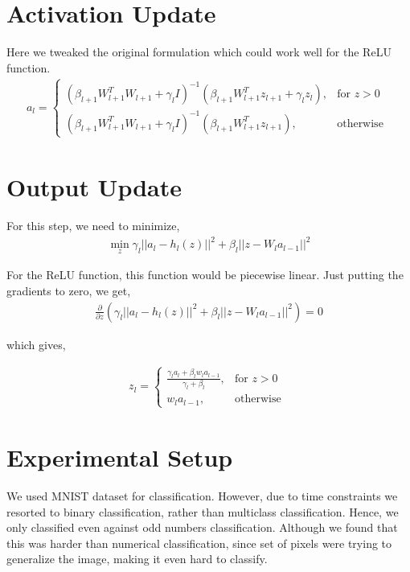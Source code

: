 \documentclass[12pt]{article}
\begin{document}
\section{Activation Update}

Here we tweaked the original formulation which could work well for the ReLU function.
\begin{align*}
	a_l = \begin{cases}
		(\beta_{l+1} W_{l+1}^TW_{l+1} + \gamma_l I)^{-1}(\beta_{l+1} W_{l+1}^Tz_{l+1} + \gamma_l z_l), & \text{for } z > 0 \\
		(\beta_{l+1} W_{l+1}^TW_{l+1} + \gamma_l I)^{-1}(\beta_{l+1} W_{l+1}^Tz_{l+1}), & \text{otherwise }
	\end{cases}
\end{align*}

\section{Output Update}

For this step, we need to minimize, 
\begin{align*}
\min_z \gamma_l || a_l - h_l(z) ||^2 + \beta_l || z - W_la_{l-1} ||^2
\end{align*}

For the ReLU function, this function would be piecewise linear. Just putting the gradients to zero, we get,
\begin{align*}
	\frac{\partial}{\partial z} \left(  \gamma_l || a_l - h_l(z) ||^2 + \beta_l || z - W_la_{l-1} ||^2 \right) = 0
\end{align*}

which gives,

\begin{align*}
	z_l = \begin{cases}
		\frac{\gamma_l a_l + \beta_l w_l a_{l-1}}{\gamma_l + \beta_l}, & \text{for } z > 0 \\
		w_la_{l-1}, & \text{otherwise }
	\end{cases}
\end{align*}

\section{Experimental Setup}
We used MNIST dataset for classification. 
However, due to time constraints we resorted to binary classification, rather than multiclass classification.
Hence, we only classified even against odd numbers classification.
Although we found that this was harder than numerical classification, since set of pixels were trying to generalize the image, making it even hard to classify.
\end{document}
